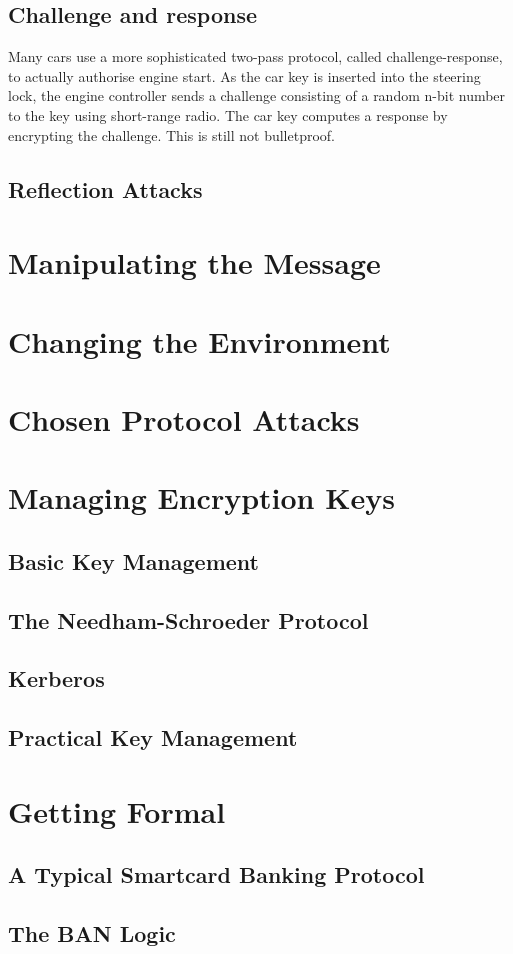 	\clearpage
	\subsection{Challenge and response}

		Many cars use a more sophisticated two-pass protocol, called challenge-response, 
		to actually authorise engine start. As the car key is inserted into the steering lock, 
		the engine controller sends a challenge consisting of a random n-bit number to the key 
		using short-range radio. The car key computes a response by encrypting the challenge. 
		This is still not bulletproof.


	\subsection{Reflection Attacks}
		

\section{Manipulating the Message}

\section{Changing the Environment}

\section{Chosen Protocol Attacks}

\section{Managing Encryption Keys}

	\subsection{Basic Key Management}

	\subsection{The Needham-Schroeder Protocol}

	\subsection{Kerberos}

	\subsection{Practical Key Management}

\section{Getting Formal}

	\subsection{A Typical Smartcard Banking Protocol}

	\subsection{The BAN Logic}



